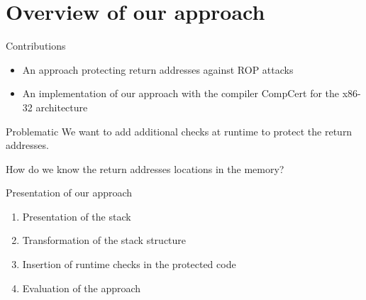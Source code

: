 \documentclass{beamer}
\begin{document}
\section{Overview of our approach}
\label{sec:Overview of our approach}


\begin{frame}[c]{Contributions}
\begin{itemize}\itemsep20pt
		\item An approach protecting return addresses against ROP attacks
		\item An implementation of our approach with the compiler CompCert for the x86-32 architecture
	\end{itemize}
\end{frame}


\begin{frame}[c]{Problematic}
	We want to add additional checks at runtime to protect the return addresses. \\
	\begin{center}
		{\Large How do we know the return addresses locations in the memory?}	
		\break
		\break
		\visible<2>{\textcolor{red}{$\Rightarrow$~Modify the memory structure to have an easy way to distinguish return addresses locations}}
	\end{center}
\end{frame}

\begin{frame}[c]{Presentation of our approach}
	\begin{enumerate}\itemsep16pt
		\item Presentation of the stack
		\item Transformation of the stack structure
		\item Insertion of runtime checks in the protected code
		\item Evaluation of the approach
	\end{enumerate}
\end{frame}
\end{document}
